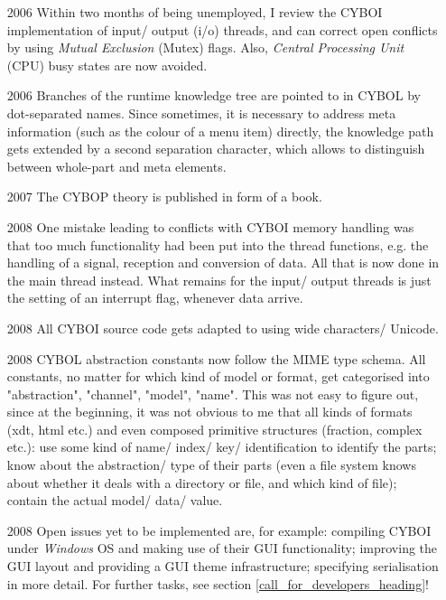\begin{itemize}
    \item[2006] Within two months of being unemployed, I review the CYBOI
        implementation of input/ output (i/o) threads, and can correct open
        conflicts by using \emph{Mutual Exclusion} (Mutex) flags.
        Also, \emph{Central Processing Unit} (CPU) busy states are now avoided.
    \item[2006] Branches of the runtime knowledge tree are pointed to in CYBOL
        by dot-separated names. Since sometimes, it is necessary to address meta
        information (such as the colour of a menu item) directly, the knowledge
        path gets extended by a second separation character, which allows to
        distinguish between whole-part and meta elements.
    \item[2007] The CYBOP theory is published in form of a book.
    \item[2008] One mistake leading to conflicts with CYBOI memory handling was
        that too much functionality had been put into the thread functions,
        e.g. the handling of a signal, reception and conversion of data.
        All that is now done in the main thread instead. What remains for the
        input/ output threads is just the setting of an interrupt flag,
        whenever data arrive.
    \item[2008] All CYBOI source code gets adapted to using wide characters/ Unicode.
    \item[2008] CYBOL abstraction constants now follow the MIME type schema.
        All constants, no matter for which kind of model or format,
        get categorised into "abstraction", "channel", "model", "name".
        This was not easy to figure out, since at the beginning,
        it was not obvious to me that all kinds of formats (xdt, html etc.)
        and even composed primitive structures (fraction, complex etc.):
        use some kind of name/ index/ key/ identification to identify the parts;
        know about the abstraction/ type of their parts (even a file system knows
        about whether it deals with a directory or file, and which kind of file);
        contain the actual model/ data/ value.
    \item[2008] Open issues yet to be implemented are, for example:
        compiling CYBOI under \emph{Windows} OS and making use of their GUI
        functionality; improving the GUI layout and providing a GUI theme
        infrastructure; specifying serialisation in more detail.
        For further tasks, see section \ref{call_for_developers_heading}!
\end{itemize}
